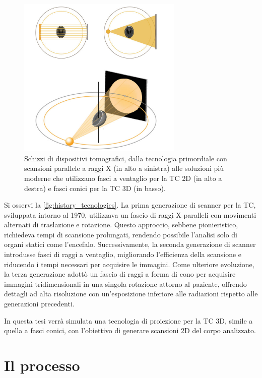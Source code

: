 \documentclass[12pt,a4paper]{report}
\begin{document}
\begin{figure}[H]
  \centering
  \includegraphics[width=0.7\textwidth]{tecniche-di-scansione}
  \caption{\label{fig:history_tecnologies} Schizzi di dispositivi tomografici, dalla tecnologia primordiale
           con scansioni parallele a raggi X (in alto a sinistra) alle soluzioni più moderne che utilizzano fasci a ventaglio per
           la TC 2D (in alto a destra) e fasci conici per la TC 3D (in basso). \cite{MoroLoli2021}}
\end{figure}

Si osservi la \autoref{fig:history_tecnologies}.
La prima generazione di scanner per la TC, sviluppata intorno al 1970, utilizzava un fascio di raggi X paralleli con movimenti
alternati di traslazione e rotazione.
Questo approccio, sebbene pionieristico, richiedeva tempi di scansione prolungati, rendendo possibile l'analisi solo di organi
statici come l'encefalo.
Successivamente, la seconda generazione di scanner introdusse fasci di raggi a ventaglio, migliorando l'efficienza della
scansione e riducendo i tempi necessari per acquisire le immagini.
Come ulteriore evoluzione, la terza generazione adottò un fascio di raggi a forma di cono per acquisire immagini tridimensionali
in una singola rotazione attorno al paziente, offrendo dettagli ad alta risoluzione con un'esposizione inferiore alle radiazioni
rispetto alle generazioni precedenti.

In questa tesi verrà simulata una tecnologia di proiezione per la TC 3D, simile a quella a fasci conici, con l'obiettivo di
generare scansioni 2D del corpo analizzato.

\section{Il processo}
\end{document}
